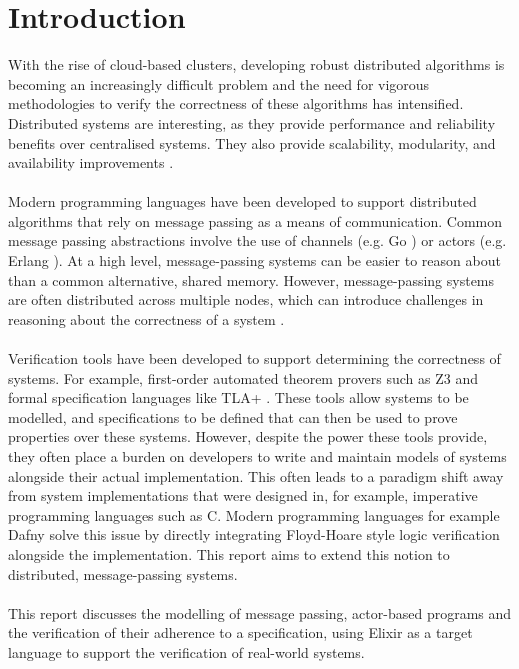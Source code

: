 \chapter{Introduction}
With the rise of cloud-based clusters, developing robust distributed algorithms is becoming an increasingly difficult problem and the need for vigorous methodologies to verify the correctness of these algorithms has intensified. Distributed systems are interesting, as they provide performance and reliability benefits over centralised systems. They also provide scalability, modularity, and availability improvements \cite{cachin}.
\\ \\ 
Modern programming languages have been developed to support distributed algorithms that rely on message passing as a means of communication. Common message passing abstractions involve the use of channels (e.g. Go \cite{go}) or actors \cite{actor} (e.g. Erlang \cite{erlang}). At a high level, message-passing systems can be easier to reason about than a common alternative, shared memory. However, message-passing systems are often distributed across multiple nodes, which can introduce challenges in reasoning about the correctness of a system \cite{science_of_systems}.
\\ \\
Verification tools have been developed to support determining the correctness of systems. For example, first-order automated theorem provers such as Z3 \cite{z3} and formal specification languages like TLA+ \cite{tlaplus}. These tools allow systems to be modelled, and specifications to be defined that can then be used to prove properties over these systems. However, despite the power these tools provide, they often place a burden on developers to write and maintain models of systems alongside their actual implementation. This often leads to a paradigm shift away from system implementations that were designed in, for example, imperative programming languages such as C. Modern programming languages for example Dafny \cite{dafny} solve this issue by directly integrating Floyd-Hoare style logic verification alongside the implementation. This report aims to extend this notion to distributed, message-passing systems.
\\ \\
This report discusses the modelling of message passing, actor-based programs and the verification of their adherence to a specification, using Elixir as a target language to support the verification of real-world systems.
